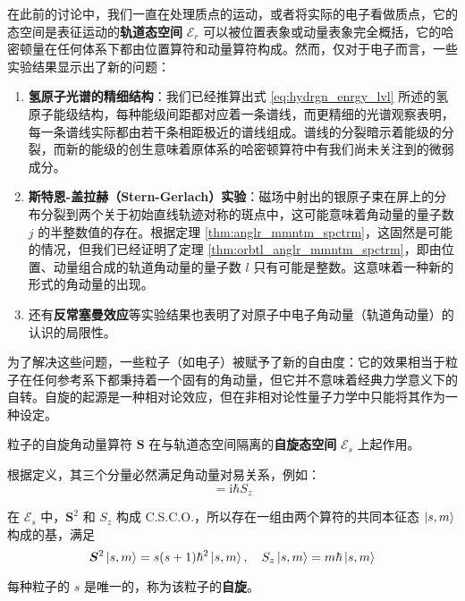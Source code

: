 \documentclass[cn,10pt,math=newtx,citestyle=gb7714-2015,bibstyle=gb7714-2015]{elegantbook}
\def\bm{\boldsymbol}
\def\ms{\mathscr}
\def\i{\mathrm i}
\begin{document}
在此前的讨论中，我们一直在处理质点的运动，或者将实际的电子看做质点，它的态空间是表征运动的\textbf{轨道态空间} $\ms E_r$ 可以被位置表象或动量表象完全概括，它的哈密顿量在任何体系下都由位置算符和动量算符构成。然而，仅对于电子而言，一些实验结果显示出了新的问题：
\begin{enumerate}
    \item \textbf{氢原子光谱的精细结构}：我们已经推算出式 \ref{eq:hydrgn_enrgy_lvl} 所述的氢原子能级结构，每种能级间距都对应着一条谱线，而更精细的光谱观察表明，每一条谱线实际都由若干条相距极近的谱线组成。谱线的分裂暗示着能级的分裂，而新的能级的创生意味着原体系的哈密顿算符中有我们尚未关注到的微弱成分。
    \item \textbf{斯特恩-盖拉赫（Stern-Gerlach）实验}：磁场中射出的银原子束在屏上的分布分裂到两个关于初始直线轨迹对称的斑点中，这可能意味着角动量的量子数 $j$ 的半整数值的存在。根据定理 \ref{thm:anglr_mmntm_spctrm}，这固然是可能的情况，但我们已经证明了定理 \ref{thm:orbtl_anglr_mmntm_spctrm}，即由位置、动量组合成的轨道角动量的量子数 $l$ 只有可能是整数。这意味着一种新的形式的角动量的出现。
    \item 还有\textbf{反常塞曼效应}等实验结果也表明了对原子中电子角动量（轨道角动量）的认识的局限性。
\end{enumerate}

为了解决这些问题，一些粒子（如电子）被赋予了新的自由度：它的效果相当于粒子在任何参考系下都秉持着一个固有的角动量，但它并不意味着经典力学意义下的自转。自旋的起源是一种相对论效应，但在非相对论性量子力学中只能将其作为一种设定。

\begin{postulate}[自旋角动量]
粒子的自旋角动量算符 $\bm S$ 在与轨道态空间隔离的\textbf{自旋态空间} $\ms E_s$ 上起作用。
\end{postulate}

根据定义，其三个分量必然满足角动量对易关系，例如：
\begin{equation}
    [S_x,S_y] = \i\hbar S_z
\end{equation}

\begin{postulate}[自旋态空间的结构]
在 $\ms E_s$ 中，$\bm S^2$ 和 $S_z$ 构成 C.S.C.O.，所以存在一组由两个算符的共同本征态 $\ket{s,m}$ 构成的基，满足
\begin{equation}
    \bm S^2\ket{s,m} = s(s+1)\hbar^2\ket{s,m},\quad S_z\ket{s,m} = m\hbar\ket{s,m}
\end{equation}

每种粒子的 $s$ 是唯一的，称为该粒子的\textbf{自旋}。
\end{postulate}
\end{document}
